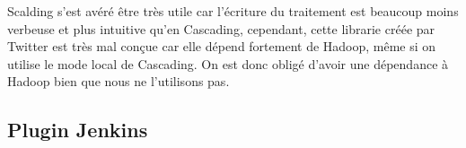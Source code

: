 Scalding s'est avéré être très utile car l'écriture du traitement est beaucoup moins verbeuse et plus intuitive qu'en Cascading, cependant, cette librarie créée par Twitter est très mal conçue car elle dépend fortement de Hadoop, même si on utilise le mode local de Cascading. On est donc obligé d'avoir une dépendance à Hadoop bien que nous ne l'utilisons pas.

\subsection{Plugin Jenkins}
